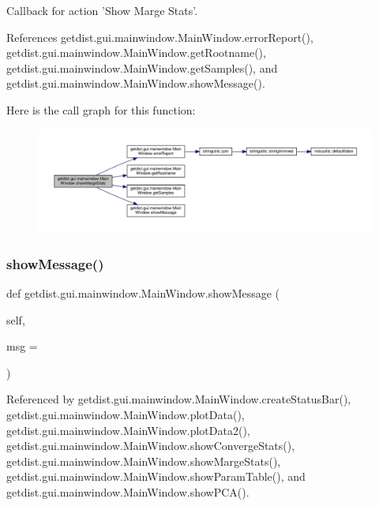 \begin{DoxyVerb}Callback for action 'Show Marge Stats'.
\end{DoxyVerb}
 

References getdist.\+gui.\+mainwindow.\+Main\+Window.\+error\+Report(), getdist.\+gui.\+mainwindow.\+Main\+Window.\+get\+Rootname(), getdist.\+gui.\+mainwindow.\+Main\+Window.\+get\+Samples(), and getdist.\+gui.\+mainwindow.\+Main\+Window.\+show\+Message().

Here is the call graph for this function\+:
\nopagebreak
\begin{figure}[H]
\begin{center}
\leavevmode
\includegraphics[width=350pt]{classgetdist_1_1gui_1_1mainwindow_1_1MainWindow_ab2bfcd95456dc31098dd7aeb11530a09_cgraph}
\end{center}
\end{figure}
\mbox{\label{classgetdist_1_1gui_1_1mainwindow_1_1MainWindow_a8d131b0b8b9945bd609acb00f21eb74f}} 
\subsubsection{\texorpdfstring{show\+Message()}{showMessage()}}
{\footnotesize\ttfamily def getdist.\+gui.\+mainwindow.\+Main\+Window.\+show\+Message (\begin{DoxyParamCaption}\item[{}]{self,  }\item[{}]{msg = {\ttfamily \textquotesingle{}\textquotesingle{}} }\end{DoxyParamCaption})}



Referenced by getdist.\+gui.\+mainwindow.\+Main\+Window.\+create\+Status\+Bar(), getdist.\+gui.\+mainwindow.\+Main\+Window.\+plot\+Data(), getdist.\+gui.\+mainwindow.\+Main\+Window.\+plot\+Data2(), getdist.\+gui.\+mainwindow.\+Main\+Window.\+show\+Converge\+Stats(), getdist.\+gui.\+mainwindow.\+Main\+Window.\+show\+Marge\+Stats(), getdist.\+gui.\+mainwindow.\+Main\+Window.\+show\+Param\+Table(), and getdist.\+gui.\+mainwindow.\+Main\+Window.\+show\+P\+C\+A().

